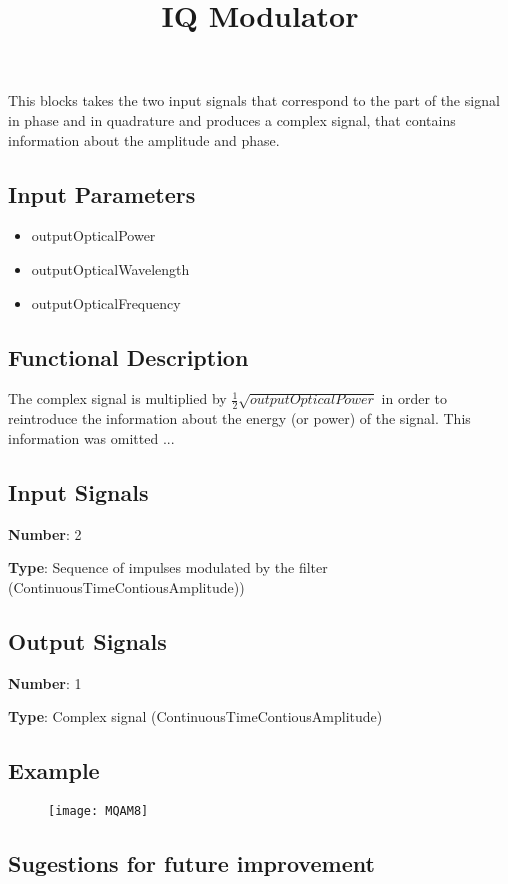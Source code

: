\documentclass[a4paper]{article}
\title{IQ Modulator}
\begin{document}
\maketitle

This blocks takes the two input signals that correspond to the part of the signal in phase and in quadrature and produces a complex signal, that contains information about the amplitude and phase. 

\subsection*{Input Parameters}

\begin{itemize}
	\item outputOpticalPower
	\item outputOpticalWavelength
	\item outputOpticalFrequency
\end{itemize}

\subsection*{Functional Description}

The complex signal is multiplied by $\frac{1}{2}\sqrt{\textit{outputOpticalPower}}$ in order to reintroduce the information about the energy (or power) of the signal. This information was omitted ...

\subsection*{Input Signals}

\textbf{Number}: 2

\textbf{Type}: Sequence of impulses modulated by the filter (ContinuousTimeContiousAmplitude))

\subsection*{Output Signals}

\textbf{Number}: 1

\textbf{Type}: Complex signal (ContinuousTimeContiousAmplitude)

\subsection*{Example}
\begin{figure}[h]
	\texttt{[image: MQAM8]}
\end{figure}

\subsection*{Sugestions for future improvement}
\end{document}
